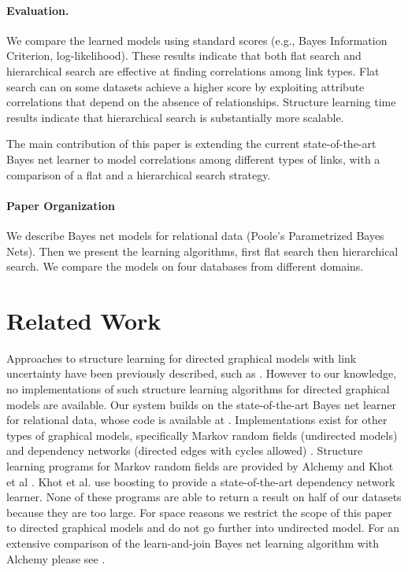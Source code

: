 \documentclass[runningheads,a4paper]{llncs}
\begin{document}
\paragraph{Evaluation.} We compare the learned models using standard scores (e.g., Bayes Information Criterion, log-likelihood). 
These results indicate that both flat search and hierarchical search are effective at finding correlations among link types. 
Flat search can on some datasets achieve a higher score by exploiting attribute correlations that depend on the absence of relationships. 
Structure learning time results indicate that hierarchical search is substantially more scalable.

The main contribution of this paper is extending the current state-of-the-art  
Bayes net learner to model correlations among different types of links, with a comparison of a flat 
and a hierarchical search strategy.



\paragraph{Paper Organization} We describe Bayes net models for relational data (Poole's Parametrized Bayes Nets). Then we present the learning algorithms, first flat search then hierarchical search. We compare the models on four databases from different domains.

\section{Related Work} \label{sec:related} Approaches to structure learning for directed graphical models with link uncertainty have been previously described, such as \cite{Getoor2007c}. However
to our knowledge, no implementations of such structure learning algorithms for directed graphical models are available. Our system builds on the state-of-the-art Bayes net learner for relational data, whose code is available at \cite{bib:jbnsite}.
Implementations exist  for other types of graphical models, specifically Markov random fields (undirected models) \cite{Domingos2009} 
and dependency networks (directed edges with cycles allowed) \cite{Natarajan2012}. 
Structure learning programs for Markov random fields are provided by Alchemy \cite{Domingos2009} and Khot et al \cite{Khot2013}. Khot et al. use boosting to provide a state-of-the-art dependency network learner. None of these programs are able to return a result on half of our datasets because they are too large. For space reasons we restrict the scope of this paper to directed graphical models and do not go further into undirected model. For an extensive comparison of the learn-and-join Bayes net learning algorithm with Alchemy please see \cite{Schulte2012}.
\end{document}

